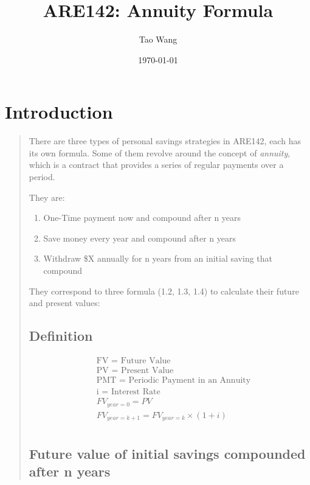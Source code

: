\documentclass{article} %
\begin{document}
\title{ARE142: Annuity Formula}
\author{Tao Wang}
\date{\today}

\maketitle

\section{Introduction}
\begin{quote}
    There are three types of personal savings strategies in ARE142, each has its own formula.
    Some of them revolve around the concept of \textit{annuity}, which is a contract that provides a series of regular payments over a period.


    They are:

    \begin{enumerate}
        \item One-Time payment now and compound after n years
        \item Save money every year and compound after n years
        \item Withdraw \$X annually for n years from an initial saving that compound
    \end{enumerate}

    They correspond to three formula (1.2, 1.3, 1.4) to calculate their future and present values:

    \subsection{Definition}
    \begin{align}
         & \text{FV = Future Value}                         \\
         & \text{PV = Present Value}                        \\
         & \text{PMT = Periodic Payment in an Annuity}      \\
         & \text{i = Interest Rate}                         \\
         & FV_{year = 0} = PV                               \\
         & FV_{year = k + 1} = FV_{year = k} \times (1 + i) \\
    \end{align}

    \subsection{Future value of initial savings compounded after n years}

\end{quote}
\end{document}
